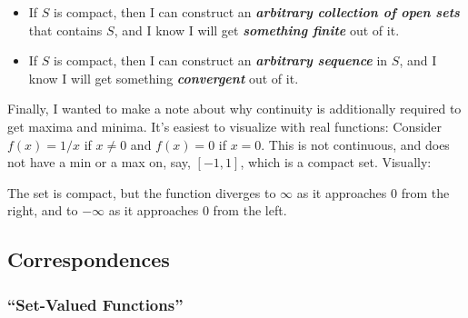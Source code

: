 \documentclass{article}
\begin{document}
\begin{itemize}[label=$\bullet$]
  \item If $S$ is compact, then I can construct an \textbf{\textit{arbitrary collection of open sets}} that contains $S$, and I know I will get \textbf{\textit{something finite}} out of it.

  \item If $S$ is compact, then I can construct an \textbf{\textit{arbitrary sequence}} in $S$, and I know I will get something \textbf{\textit{convergent}} out of it.
\end{itemize}

Finally, I wanted to make a note about why continuity is additionally required to get maxima and minima. It's easiest to visualize with real functions: Consider $f(x) = 1/x$ if $x \ne 0$ and $f(x) = 0$ if  $x = 0$. This is not continuous, and does not have a min or a max on, say, $[-1, 1]$, which is a compact set. Visually:
\begin{figure}[!ht]
  \centering
\end{figure}

The set is compact, but the function diverges to $\infty$ as it approaches $0$ from the right, and to $-\infty$ as it approaches $0$ from the left.

\subsection{Correspondences}
\label{sub:correspondences}

\subsubsection{``Set-Valued Functions''}
\label{ssub:_set_valued_functions_}
\end{document}
